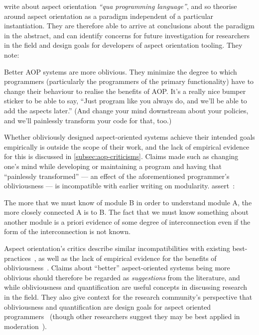 \citeauthor{filman2000aspect} write about aspect orientation \emph{``qua
programming language''}, and so theorise around aspect orientation as a paradigm
independent of a particular instantiation. They are therefore able to arrive at
conclusions about the paradigm in the abstract, and can identify concerns for
future investigation for researchers in the field and design goals for
developers of aspect orientation tooling. They note:

\begin{blockquote}
Better AOP systems are more oblivious. They minimize the degree to which
programmers (particularly the programmers of the primary functionality) have to
change their behaviour to realise the benefits of AOP. It's a really nice bumper
sticker to be able to say, ``Just program like you always do, and we'll be able
to add the aspects later.'' (And change your mind downstream about your
policies, and we'll painlessly transform your code for that, too.)
\end{blockquote}

Whether obliviously designed aspect-oriented systems achieve their intended
goals empirically is outside the scope of their work, and the lack of empirical
evidence for this is discussed in \cref{subsec:aop-criticisms}. Claims made such
as changing one's mind while developing or maintaining a program and having that
``painlessly transformed'' --- an effect of the aforementioned programmer's
obliviousness --- is incompatible with earlier writing on modularity.
\citeauthor{yourdon1979structured} assert~\cite{yourdon1979structured}: 

\begin{blockquote}
The more that we must know of module B in order to understand module A, the more closely connected A is to B. The fact that we must know something about another module is a priori evidence of some degree of interconnection even if the form of the interconnection is not known. 
\end{blockquote}

Aspect orientation's critics describe similar incompatibilities with existing
best-practices~\cite{przybylek2010wrong,Constantinides04aopconsidered}, as well
as the lack of empirical evidence for the benefits of
obliviousness~\cite{steimann06paradoxical}. Claims about ``better''
aspect-oriented systems being more oblivious should therefore be regarded as
\emph{suggestions} from the literature, and while obliviousness and
quantification are useful concepts in discussing research in the field. They
also give context for the research community's perspective that obliviousness
and quantification are design goals for aspect oriented
programmers~\cite{AspectCplusplusDesignImp,kell2008survey,aspect oriented
workflow} (though other researchers suggest they may be best applied in
moderation~\cite{leavens2007multiple}).


